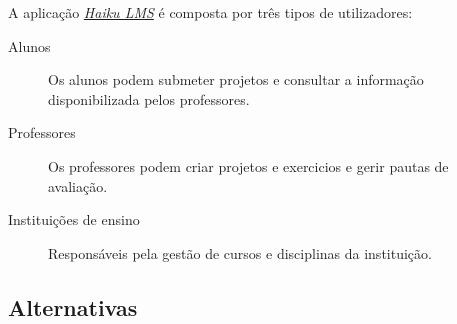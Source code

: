 A aplicação \href{http://www.haikulearning.com/}{\emph{Haiku LMS}} é composta por três tipos de utilizadores:

\begin{description}
	\item[Alunos] Os alunos podem submeter projetos e consultar a informação disponibilizada pelos professores.
	\item[Professores] Os professores podem criar projetos e exercicios e gerir pautas de avaliação.
	\item[Instituições de ensino] Responsáveis pela gestão de cursos e disciplinas da instituição.
\end{description}

\subsection{Alternativas} %
\label{sub:alternativas}

